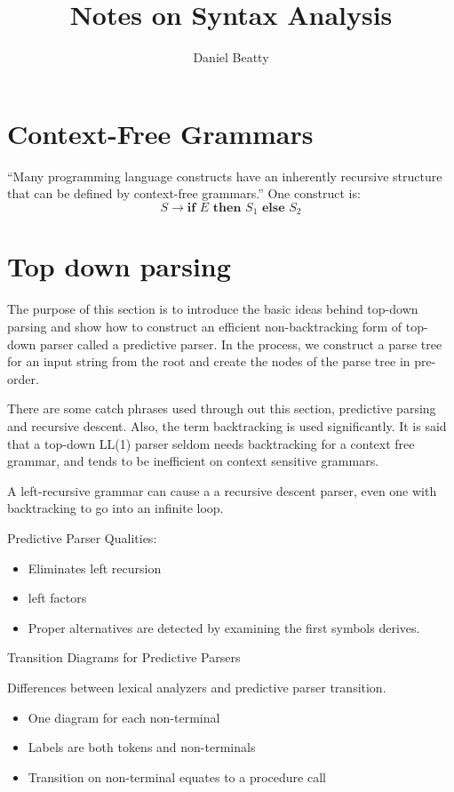 \documentclass[11pt]{article}
\title{Notes on Syntax Analysis}
\author{Daniel Beatty}
\begin{document}
\maketitle


\section {Context-Free Grammars}
``Many programming language constructs have an inherently recursive structure that can be defined by context-free grammars.''    One construct is:
\[ S \rightarrow \textbf{if } E \textbf { then } S_1 \textbf{ else } S_2 \]  

\section {Top down parsing}
The purpose of this section is to introduce the basic ideas behind top-down parsing and show how to construct an efficient non-backtracking form of top-down parser called a predictive parser.   In the process, we construct a parse tree for an input string from the root and create the nodes of the parse tree in pre-order.  

There are some catch phrases used through out this section, predictive parsing and recursive descent.  Also, the term backtracking is used significantly.  It is said that a top-down LL(1) parser seldom needs backtracking for a context free grammar, and tends to be inefficient on context sensitive grammars.  

A left-recursive grammar can cause a a recursive descent parser, even one with backtracking to go into an infinite loop.  

Predictive Parser Qualities:
\begin{itemize}
\item Eliminates left recursion 
\item left factors
\item Proper alternatives are detected by examining the first symbols derives.
\end{itemize}


Transition Diagrams for Predictive Parsers 

Differences between lexical analyzers and predictive parser transition.  
\begin{itemize}
\item One diagram for each non-terminal 
\item Labels are both tokens and non-terminals
\item Transition on non-terminal equates to a procedure call
\end{itemize}
\end{document}

